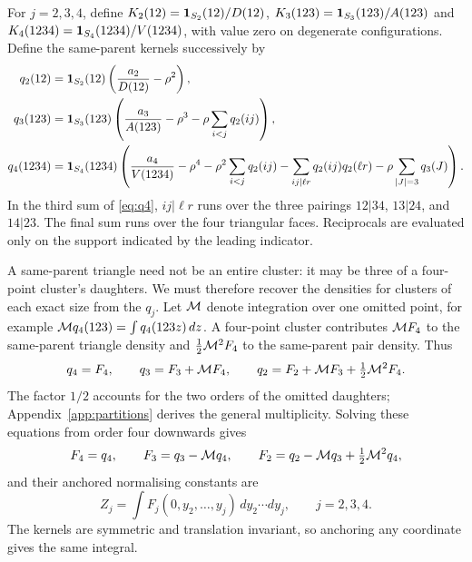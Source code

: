 For $j=2,3,4$, define $K_2(12)=\mathbf 1_{S_2}(12)/D(12)$, $K_3(123)=\mathbf 1_{S_3}(123)/A(123)$ and $K_4(1234)=\mathbf 1_{S_4}(1234)/V(1234)$, with value zero on degenerate configurations. Define the same-parent kernels successively by
\begin{align}
 q_2(12)&=\mathbf 1_{S_2}(12)\left(\frac{a_2}{D(12)}-\rho^2\right),\label{eq:q2}\\
 q_3(123)&=\mathbf 1_{S_3}(123)\left(\frac{a_3}{A(123)}-\rho^3-\rho\sum_{i<j}q_2(ij)\right),\label{eq:q3}\\
 q_4(1234)&=\mathbf 1_{S_4}(1234)\left(\frac{a_4}{V(1234)}-\rho^4-\rho^2\sum_{i<j}q_2(ij)
 -\sum_{ij|\ell r}q_2(ij)q_2(\ell r)-\rho\sum_{|J|=3}q_3(J)\right).\label{eq:q4}
\end{align}
In the third sum of \eqref{eq:q4}, $ij|\ell r$ runs over the three pairings $12|34$, $13|24$, and $14|23$. The final sum runs over the four triangular faces. Reciprocals are evaluated only on the support indicated by the leading indicator.

A same-parent triangle need not be an entire cluster: it may be three of a four-point cluster's daughters. We must therefore recover the densities for clusters of each exact size from the $q_j$. Let $\mathcal M$ denote integration over one omitted point, for example $\mathcal M q_4(123)=\int q_4(123z)\,dz$. A four-point cluster contributes $\mathcal M F_4$ to the same-parent triangle density and $\tfrac12\mathcal M^2F_4$ to the same-parent pair density. Thus
\[
 q_4=F_4,\qquad q_3=F_3+\mathcal M F_4,\qquad
 q_2=F_2+\mathcal M F_3+\tfrac12\mathcal M^2F_4.
\]
The factor $1/2$ accounts for the two orders of the omitted daughters; Appendix~\ref{app:partitions} derives the general multiplicity. Solving these equations from order four downwards gives
\begin{equation}
 F_4=q_4,\qquad F_3=q_3-\mathcal M q_4,\qquad
 F_2=q_2-\mathcal M q_3+\tfrac12\mathcal M^2q_4,
 \label{eq:Fkernels}
\end{equation}
and their anchored normalising constants are
\[
 Z_j=\int F_j(0,y_2,\ldots,y_j)\,dy_2\cdots dy_j,\qquad j=2,3,4.
\]
The kernels are symmetric and translation invariant, so anchoring any coordinate gives the same integral.

